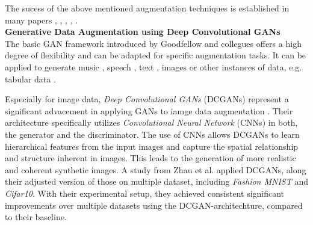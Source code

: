 The sucess of the above mentioned augmentation techniques is established in many papers \cite{perez2017effectivenessdataaugmentationimage}, \cite{NIPS2012_c399862d}, \cite{Ying2019overfittinganditssolutions}, \cite{shorten2019survey}, \cite{WanLiZeiler2013}.\\





\noindent\textbf{Generative Data Augmentation using Deep Convolutional GANs}\label{dcgans_data_augmentation} \\
The basic GAN framework introduced by Goodfellow and collegues offers a high degree of flexibility and can be adapted for specific augmentation tasks. It can be applied to generate music \cite{dong2017museganmultitracksequentialgenerative}, speech \cite{li2022ttsgantransformerbasedtimeseriesgenerative}, text \cite{yu2017seqgansequencegenerativeadversarial}, images \cite{goodfellow2014generativeadversarialnetworks} or other instances of data, e.g. tabular data \cite{xu2019modelingtabulardatausing}.

Especially for image data, \textit{Deep Convolutional GANs} (DCGANs) represent a significant advacement in applying GANs to iamge data augmentation \cite{huang2022tutorial}. Their architecture specifically utilizes \textit{Convolutional Neural Network} (CNNs) \cite{LeCun1989firstcnnpaper} in both, the generator and the discriminator. The use of CNNs allows DCGANs to learn hierarchical features from the input images and capture the spatial relationship and structure inherent in images. This leads to the generation of more realistic and coherent synthetic images. A study from Zhau et al. \cite{zhao2023gan} applied DCGANs, along their adjusted version of those on multiple dataset, including \textit{Fashion MNIST} and \textit{Cifar10}. With their experimental setup, they achieved consistent significant improvements over multiple datasets using the DCGAN-architechture, compared to their baseline. \\



